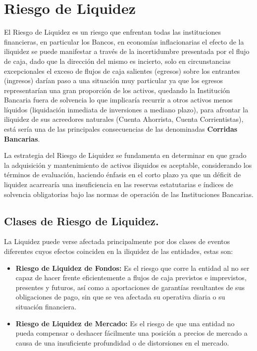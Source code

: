\documentclass[10pt,]{article}
\begin{document}
\hypertarget{riesgo-de-liquidez}{%
\section{Riesgo de Liquidez}\label{riesgo-de-liquidez}}

El Riesgo de Liquidez es un riesgo que enfrentan todas las instituciones
financieras, en particular los Bancos, en economías inflacionarias el
efecto de la iliquidez se puede manifestar a través de la incertidumbre
presentada por el flujo de caja, dado que la dirección del mismo es
incierto, solo en circunstancias excepcionales el exceso de flujos de
caja salientes (egresos) sobre los entrantes (ingresos) darían paso a
una situación muy particular ya que los egresos representarían una gran
proporción de los activos, quedando la Institución Bancaria fuera de
solvencia lo que implicaría recurrir a otros activos menos líquidos
(liquidación inmediata de inversiones a mediano plazo), para afrontar la
iliquidez de sus acreedores naturales (Cuenta Ahorrista, Cuenta
Corrientistas), está sería una de las principales consecuencias de las
denominadas \textbf{Corridas Bancarias}.

La estrategia del Riesgo de Liquidez se fundamenta en determinar en que
grado la adquisición y mantenimiento de activos iliquidos es aceptable,
considerando los términos de evaluación, haciendo énfasis en el corto
plazo ya que un déficit de liquidez acarrearía una insuficiencia en las
reservas estatutarias e índices de solvencia obligatorias bajo las
normas de operación de las Instituciones Bancarias.

\hypertarget{clases-de-riesgo-de-liquidez.}{%
\subsection{\texorpdfstring{\textbf{Clases de Riesgo de
Liquidez.}}{Clases de Riesgo de Liquidez.}}\label{clases-de-riesgo-de-liquidez.}}

La Liquidez puede verse afectada principalmente por dos clases de
eventos diferentes cuyos efectos coinciden en la iliquidez de las
entidades, estas son:

\begin{itemize}
\item
  \textbf{Riesgo de Liquidez de Fondos:} Es el riesgo que corre la
  entidad al no ser capaz de hacer frente eficientemente a flujos de
  caja previstos e imprevistos, presentes y futuros, así como a
  aportaciones de garantías resultantes de sus obligaciones de pago, sin
  que se vea afectada su operativa diaria o su situación financiera.
\item
  \textbf{Riesgo de Liquidez de Mercado:} Es el riesgo de que una
  entidad no pueda compensar o deshacer fácilmente una posición a
  precios de mercado a causa de una insuficiente profundidad o de
  distorsiones en el mercado.
\end{itemize}
\end{document}
